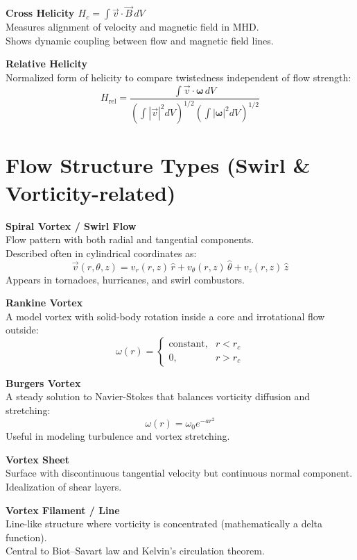 \documentclass[a4paper, aps,preprint,superscriptaddress, 12pt]{revtex4}
\begin{document}
    \medskip
    \textbf{Cross Helicity \( H_c = \int \vec{v} \cdot \vec{B} \, dV \)} \\
    Measures alignment of velocity and magnetic field in MHD. \\
    Shows dynamic coupling between flow and magnetic field lines.

    \medskip
    \textbf{Relative Helicity} \\
    Normalized form of helicity to compare twistedness independent of flow strength:
    \[
        H_{\text{rel}} = \frac{\int \vec{v} \cdot \boldsymbol{\omega} \, dV}
        {\left( \int |\vec{v}|^2 dV \right)^{1/2}
            \left( \int |\boldsymbol{\omega}|^2 dV \right)^{1/2}}
    \]

    \section*{Flow Structure Types (Swirl \& Vorticity-related)}

    \textbf{Spiral Vortex / Swirl Flow} \\
    Flow pattern with both radial and tangential components. \\
    Described often in cylindrical coordinates as:
    \[
        \vec{v}(r,\theta,z) = v_r(r,z) \, \hat{r} + v_\theta(r,z) \, \hat{\theta} + v_z(r,z) \, \hat{z}
    \]
    Appears in tornadoes, hurricanes, and swirl combustors.

    \medskip
    \textbf{Rankine Vortex} \\
    A model vortex with solid-body rotation inside a core and irrotational flow outside:
    \[
        \omega(r) =
        \begin{cases}
            \text{constant}, & r < r_c \\
            0, & r > r_c
        \end{cases}
    \]

    \medskip
    \textbf{Burgers Vortex} \\
    A steady solution to Navier-Stokes that balances vorticity diffusion and stretching:
    \[
        \omega(r) = \omega_0 e^{-a r^2}
    \]
    Useful in modeling turbulence and vortex stretching.

    \medskip
    \textbf{Vortex Sheet} \\
    Surface with discontinuous tangential velocity but continuous normal component. \\
    Idealization of shear layers.

    \medskip
    \textbf{Vortex Filament / Line} \\
    Line-like structure where vorticity is concentrated (mathematically a delta function). \\
    Central to Biot–Savart law and Kelvin's circulation theorem.
\end{document}
